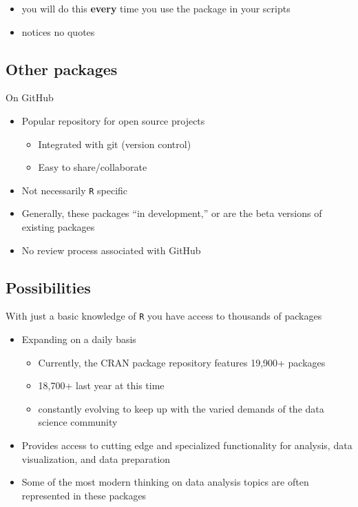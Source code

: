 \documentclass[
  letterpaper,
  DIV=11,
  numbers=noendperiod,
  oneside]{scrartcl}
\providecommand{\tightlist}{%
  \setlength{\itemsep}{0pt}\setlength{\parskip}{0pt}}\usepackage{longtable,booktabs,array}
\begin{document}
\begin{itemize}
\tightlist
\item
  you will do this \textbf{every} time you use the package in your
  scripts
\item
  notices no quotes
\end{itemize}

\hypertarget{other-packages}{%
\subsection{Other packages}\label{other-packages}}

On GitHub

\begin{itemize}
\tightlist
\item
  Popular repository for open source projects

  \begin{itemize}
  \tightlist
  \item
    Integrated with git (version control)
  \item
    Easy to share/collaborate
  \end{itemize}
\item
  Not necessarily \texttt{R} specific
\item
  Generally, these packages ``in development,'' or are the beta versions
  of existing packages
\item
  No review process associated with GitHub
\end{itemize}

\hypertarget{possibilities}{%
\subsection{Possibilities}\label{possibilities}}

With just a basic knowledge of \texttt{R} you have access to thousands
of packages

\begin{itemize}
\tightlist
\item
  Expanding on a daily basis

  \begin{itemize}
  \tightlist
  \item
    Currently, the CRAN package repository features 19,900+ packages
  \item
    18,700+ last year at this time
  \item
    constantly evolving to keep up with the varied demands of the data
    science community
  \end{itemize}
\item
  Provides access to cutting edge and specialized functionality for
  analysis, data visualization, and data preparation
\item
  Some of the most modern thinking on data analysis topics are often
  represented in these packages
\end{itemize}
\end{document}
